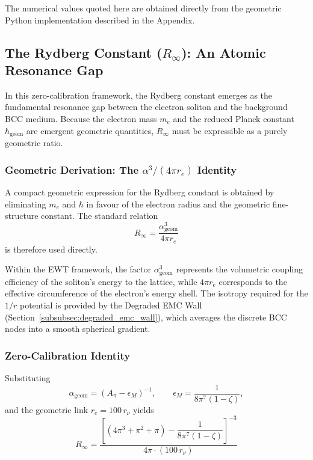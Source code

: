 \documentclass[10pt,a4paper]{article}
\begin{document}
The numerical values quoted here are obtained directly from the geometric Python implementation described in the Appendix.

\subsection{The Rydberg Constant (\(R_{\infty}\)): An Atomic Resonance Gap}
\label{sec:rydberg_constant}

In this zero-calibration framework, the Rydberg constant emerges as the fundamental resonance gap between the electron soliton and the background BCC medium. Because the electron mass \(m_e\) and the reduced Planck constant \(\hbar_{\text{geom}}\) are emergent geometric quantities, \(R_{\infty}\) must be expressible as a purely geometric ratio.

\subsubsection{Geometric Derivation: The \(\alpha^3/(4\pi r_e)\) Identity}

A compact geometric expression for the Rydberg constant is obtained by eliminating \(m_e\) and \(\hbar\) in favour of the electron radius and the geometric fine-structure constant. The standard relation
\begin{equation}
	R_{\infty}
	=
	\frac{\alpha_{\text{geom}}^3}{4\pi r_e}
	\label{eq:rydberg_geometric_form}
\end{equation}
is therefore used directly.

Within the EWT framework, the factor \(\alpha_{\text{geom}}^3\) represents the volumetric coupling efficiency of the soliton's energy to the lattice, while \(4\pi r_e\) corresponds to the effective circumference of the electron's energy shell. The isotropy required for the \(1/r\) potential is provided by the Degraded EMC Wall (Section~\ref{subsubsec:degraded_emc_wall}), which averages the discrete BCC nodes into a smooth spherical gradient.

\subsubsection{Zero-Calibration Identity}

Substituting
\[
\alpha_{\text{geom}}
=
\left(
A_\pi - \epsilon_M
\right)^{-1},
\qquad
\epsilon_M = \frac{1}{8\pi^7(1-\zeta)},
\]
and the geometric link \(r_e = 100\,r_\nu\) yields
\begin{equation}
	\boxed{
		R_{\infty}
		=
		\frac{
			\left[
			(4\pi^3 + \pi^2 + \pi)
			-
			\dfrac{1}{8\pi^7(1-\zeta)}
			\right]^{-3}
		}{
			4\pi \cdot (100\,r_\nu)
		}
	}
	\label{eq:rydberg_final}
\end{equation}
\end{document}
